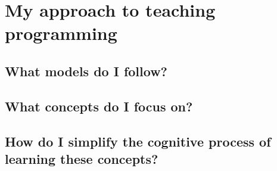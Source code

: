 \chapter{My approach to teaching programming}

\section{What models do I follow?}

\section{What concepts do I focus on?}

\section{How do I simplify the cognitive process of learning these concepts?}